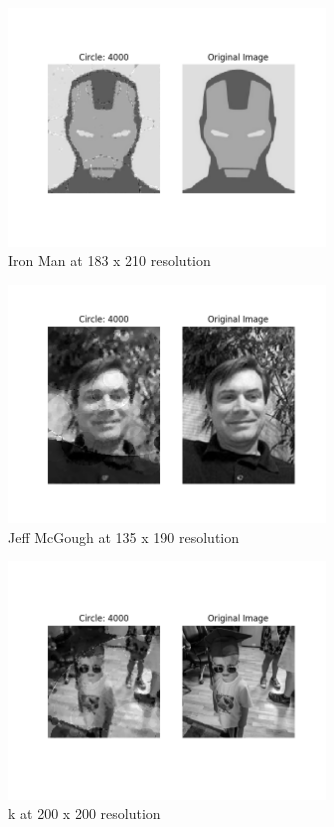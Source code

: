 \documentclass[12pt]{article}
\begin{document}
\begin{figure}[H]
\centering
\noindent\includegraphics[width=0.75\textwidth]{../results/ironman/ironman_4000}
\caption{Iron Man at 183 x 210 resolution}
\end{figure}

\begin{figure}[H]
\centering
\noindent\includegraphics[width=0.75\textwidth]{../results/jmcgough/jmcgough_4000}
\caption{Jeff McGough at 135 x 190 resolution}
\end{figure}

\begin{figure}[H]
\centering
\noindent\includegraphics[width=0.75\textwidth]{../results/k/k_4000}
\caption{k at 200 x 200 resolution}
\end{figure}
\end{document}

